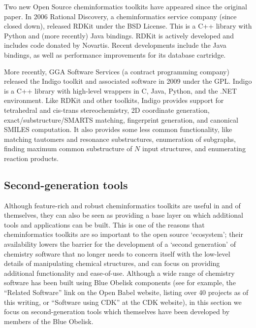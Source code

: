 \documentclass[10pt]{bmc_article}
\newenvironment{bmcformat}{\fussy\setboolean{publ}{true}}{\fussy}
\begin{document}
\begin{bmcformat}
Two new Open Source cheminformatics toolkits have appeared since the
original paper. In 2006 Rational Discovery, a cheminformatics service
company (since closed down), released RDKit \cite{WebRDKit} under the
BSD License. This is a C++ library with Python and (more recently)
Java bindings. RDKit is actively developed and includes
code donated by Novartis. Recent developments include the Java
bindings, as well as performance improvements for its database
cartridge.

More recently, GGA Software Services
(a contract programming company)
released the Indigo toolkit \cite{WebIndigo} and associated software
in 2009 under the GPL. Indigo is a C++ library with
high-level wrappers in C, Java, Python, and the .NET
environment. Like RDKit and other toolkits, Indigo provides support for
tetrahedral and cis-trans stereochemistry, 2D coordinate generation,
exact/substructure/SMARTS matching, fingerprint generation, and
canonical SMILES computation.
It also provides some less common functionality, like matching
tautomers and resonance substructures, enumeration of subgraphs,
finding maximum common substructure of $N$ input structures, and
enumerating reaction products.

\subsection*{Second-generation tools}

Although feature-rich and robust cheminformatics toolkits are useful
in and of themselves, they can also be seen as providing a base layer
on which additional tools and applications can be built. This is one
of the reasons that cheminformatics toolkits are so important to the
open source `ecosystem'; their availability lowers the barrier for the
development of a `second generation' of chemistry software that no
longer needs to concern itself with the low-level details of
manipulating chemical structures, and can focus on providing
additional functionality and ease-of-use. Although a wide range of
chemistry software has been built using Blue Obelisk
components (see for example, the ``Related Software'' link on the Open
Babel website,\cite{WebOBRelated} listing over 40 projects as of this writing, 
or ``Software using CDK'' at the CDK website), in this
section we focus on second-generation tools which themselves have been
developed by members of the Blue Obelisk. 


\end{bmcformat}
\end{document}
